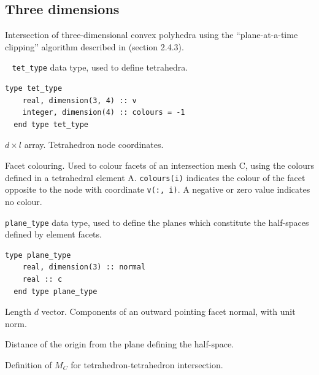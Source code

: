 \documentclass{article}
\begin{document}
\subsection{Three dimensions}\label{sect:3D_intersection}

Intersection of three-dimensional convex polyhedra using the ``plane-at-a-time
clipping'' algorithm described in \citet{eberly2007} (section 2.4.3).

~\newline
\verb+tet_type+ data type, used to define tetrahedra.

\begin{lstlisting}[language=FORTRAN]
  type tet_type
    real, dimension(3, 4) :: v
    integer, dimension(4) :: colours = -1
  end type tet_type
\end{lstlisting}

\begin{description}[font=\ttfamily\bfseries,leftmargin=2.2\parindent,labelindent=1.7\parindent,noitemsep]
  \item[v] $d \times l$ array. Tetrahedron node coordinates.
  \item[colours] Facet colouring. Used to colour facets of an intersection mesh
    C, using the colours defined in a tetrahedral element A. \verb+colours(i)+
    indicates the colour of the facet opposite to the node with coordinate
    \verb+v(:, i)+. A negative or zero value indicates no colour.
\end{description}

\noindent \verb+plane_type+ data type, used to define the planes which
constitute the half-spaces defined by element facets.

\begin{lstlisting}[language=FORTRAN]
  type plane_type
    real, dimension(3) :: normal
    real :: c
  end type plane_type
\end{lstlisting}

\begin{description}[font=\ttfamily\bfseries,leftmargin=2.2\parindent,labelindent=1.7\parindent,noitemsep]
  \item[normal] Length $d$ vector. Components of an outward pointing facet
    normal, with unit norm.
  \item[c] Distance of the origin from the plane defining the half-space.
\end{description}

\noindent Definition of $M_C$ for tetrahedron-tetrahedron intersection.
\end{document}
